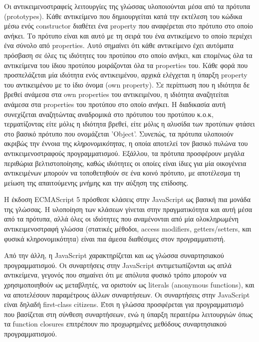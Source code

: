\documentclass[../thesis.tex]{subfiles}
\begin{document}
Οι αντικειμενοστραφείς λειτουργίες της γλώσσας υλοποιούνται μέσα από τα πρότυπα (prototypes).
Κάθε αντικείμενο που δημιουργείται κατά την εκτέλεση του κώδικα μέσω ενός constructor διαθέτει ένα property που αναφέρεται στο πρότυπο στο οποίο ανήκει.
Το πρότυπο είναι και αυτό με τη σειρά του ένα αντικείμενο το οποίο περιέχει ένα σύνολο από properties.
Αυτό σημαίνει ότι κάθε αντικείμενο έχει αυτόματα πρόσβαση σε όλες τις ιδιότητες του προτύπου στο οποίο ανήκει, και επομένως όλα τα αντικείμενα του ίδιου προτύπου μοιράζονται όλα τα properties του.
Κάθε φορά που προσπελάζεται μία ιδιότητα ενός αντικειμένου, αρχικά ελέγχεται η ύπαρξη property του αντικειμένου με το ίδιο όνομα (own property).
Σε περίπτωση που η ιδιότητα δε βρεθεί ανάμεσα στα own properties του αντικειμένου, η ιδιότητα αναζητείται ανάμεσα στα properties του προτύπου στο οποίο ανήκει.
Η διαδικασία αυτή συνεχίζεται αναζητώντας αναδρομικά στο πρότυπου του προτύπου κ.ο.κ, τερματίζοντας είτε μόλις η ιδιότητα βρεθεί, είτε μόλις η αλυσίδα των προτύπων φτάσει στο βασικό πρότυπο που ονομάζεται 'Object'.
Συνεπώς, τα πρότυπα υλοποιούν ακριβώς την έννοια της \textit{κληρονομικότητας}, η οποία αποτελεί τον βασικό πυλώνα του αντικειμενοστραφούς προγραμματισμού.
Εξάλλου, τα πρότυπα προσφέρουν μεγάλα περιθώρια βελτιστοποίησης, καθώς ιδιότητες οι οποίες είναι ίδιες για μία οικογένεια αντικειμένων μπορούν να τοποθετηθούν σε ένα κοινό πρότυπο, με αποτέλεσμα τη μείωση της απαιτούμενης μνήμης και την αύξηση της επίδοσης.

Η έκδοση ECMAScript 5 πρόσθεσε κλάσεις στην JavaScript ως βασική πια μονάδα της γλώσσας.
Η υλοποίηση των κλάσεων γίνεται στην πραγματικότητα και αυτή μέσα από τα πρότυπα, αλλά όλες οι ιδιότητες που αναμένονται από μία ολοκληρωμένη αντικειμενοστραφή γλώσσα (στατικές μέθοδοι, access modifiers, getters/setters, και φυσικά κληρονομικότητα) είναι πια άμεσα διαθέσιμες στον προγραμματιστή.

\bigskip

Από την άλλη, η JavaScript χαρακτηρίζεται και ως γλώσσα συναρτησιακού προγραμματισμού.
Οι συναρτήσεις στην JavaScript αντιμετωπίζονται ως απλά αντικείμενα, γεγονός που σημαίνει ότι με απόλυτα φυσικό τρόπο μπορούν να χρησιμοποιηθούν ως μεταβλητές, να οριστούν ως literals (anonymous functions), και να αποτελέσουν παραμέτρους άλλων συναρτήσεων.
Οι συναρτήσεις στην JavaScript είναι δηλαδή first-class citizens.
Έτσι η γλώσσα προσφέρεται για προγραμματισμό που βασίζεται στη σύνθεση συναρτήσεων, ενώ η ύπαρξη περαιτέρω λειτουργιών όπως τα function closures επιτρέπουν πιο προχωρημένες μεθόδους συναρτησιακού προγραμματισμού.
\end{document}
